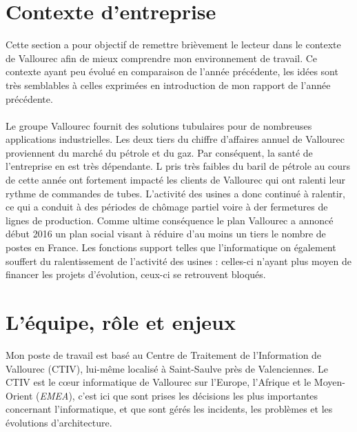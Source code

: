 \documentclass[a4paper,12pt]{report}
\begin{document}
\section{Contexte d'entreprise}
Cette section a pour objectif de remettre brièvement le lecteur dans le contexte de Vallourec afin de mieux comprendre mon environnement de travail. Ce contexte ayant peu évolué en comparaison de l'année précédente, les idées sont très semblables à celles exprimées en introduction de mon rapport de l'année précédente.

\paragraph{}
Le groupe Vallourec fournit des solutions tubulaires pour de nombreuses applications industrielles. 
Les deux tiers du chiffre d'affaires annuel de Vallourec proviennent du marché du pétrole et du gaz. Par conséquent, la santé de l'entreprise en est très dépendante. L pris très faibles du baril de pétrole au cours de cette année ont fortement impacté les clients de Vallourec qui ont ralenti leur rythme de commandes de tubes. L'activité des usines a donc continué à ralentir, ce qui a conduit à des périodes de chômage partiel voire à der fermetures de lignes de production. Comme ultime conséquence le plan Vallourec a annoncé début 2016 un plan social visant à réduire d'au moins un tiers le nombre de postes en France. Les fonctions support telles que l'informatique on également souffert du ralentissement de l'activité des usines : celles-ci n'ayant plus moyen de financer les projets d'évolution, ceux-ci se retrouvent bloqués.

\section{L'équipe, rôle et enjeux}
Mon poste de travail est basé au Centre de Traitement de l'Information de Vallourec (CTIV), lui-même localisé à Saint-Saulve près de Valenciennes. Le CTIV est le cœur informatique de Vallourec sur l'Europe, l'Afrique et le Moyen-Orient (\textit{EMEA}), c'est ici que sont prises les décisions les plus importantes concernant l'informatique, et que sont gérés les incidents, les problèmes et les évolutions d'architecture.
\end{document}
